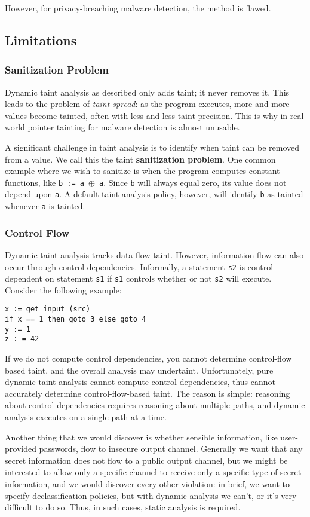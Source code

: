 However, for privacy-breaching malware detection, the method is flawed.

\subsection{Limitations}
\subsubsection{Sanitization Problem}
Dynamic taint analysis as described only adds taint; it never removes it. This leads to the problem of \textit{taint spread}: as the program executes, more and more values become tainted, often with less and less taint precision. This is why in real world pointer tainting for malware detection is almost unusable.

A significant challenge in taint analysis is to identify when taint can be removed from a value. We call this the taint \textbf{sanitization problem}. One common example where we wish to sanitize is when the program computes constant functions, like \texttt{b := a $\oplus$ a}. Since \texttt{b} will always equal zero, its value does not depend upon \texttt{a}. A default taint analysis policy, however, will identify \texttt{b} as tainted whenever \texttt{a} is tainted.

\subsubsection{Control Flow}
Dynamic taint analysis tracks data flow taint. However, information flow can also occur through control dependencies. Informally, a statement \texttt{s2} is control-dependent on statement \texttt{s1} if \texttt{s1} controls whether or not \texttt{s2} will execute. Consider the following example:

\begin{lstlisting}
x := get_input (src)
if x == 1 then goto 3 else goto 4
y := 1
z : = 42
\end{lstlisting}

If we do not compute control dependencies, you cannot determine control-flow based taint, and the overall analysis may undertaint. Unfortunately, pure dynamic taint analysis cannot compute control dependencies, thus cannot accurately determine control-flow-based taint. The reason is simple: reasoning about control dependencies requires reasoning about multiple paths, and dynamic analysis executes on a single path at a time.

Another thing that we would discover is whether sensible information, like user-provided passwords, flow to insecure output channel. Generally we want that any secret information does not flow to a public output channel, but we might be interested to allow only a specific channel to receive only a specific type of secret information, and we would discover every other violation: in brief, we want to specify declassification policies, but with dynamic analysis we can't, or it's very difficult to do so. Thus, in such cases, static analysis is required.